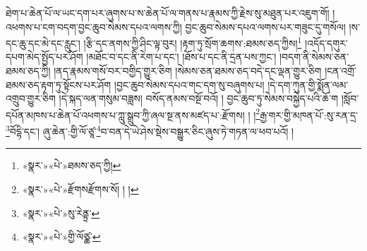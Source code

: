 ཐེག་པ་ཆེན་པོ་ལ་ཡང་དག་པར་ཞུགས་པ་ས་ཆེན་པོ་ལ་གནས་པ་རྣམས་ཀྱི་རྗེས་སུ་མཐུན་པར་འཇུག་གོ། །འཕགས་པ་ངག་བདག་བྱང་ཆུབ་སེམས་དཔའ་ལགས་ཀྱི། བྱང་ཆུབ་སེམས་དཔའ་ལགས་པར་གཟུང་དུ་གསོལ། །ས་དང་ཆུ་དང་མེ་དང་རླུང་། །རྩི་དང་ནགས་ཀྱི་ཤིང་ལྟ་བུར། །རྟག་ཏུ་སྲོག་ཆགས་:ཐམས་ཅད་ཀྱིས།\footnote{«སྣར་»«པེ་»ཐམས་ཅད་ཀྱི།} །འདོད་དགུར་དཔག་མེད་སྤྱོད་པར་ཤོག །མཐོང་བ་དང་ནི་རེག་པ་དང་། །ཐོས་པ་དང་ནི་དྲན་པས་ཀྱང་། །བདག་ནི་སེམས་ཅན་ཐམས་ཅད་ཀྱི། །ནད་རྣམས་གསོ་བར་བགྱིད་གྱུར་ཅིག །སེམས་ཅན་ཐམས་ཅད་བདེ་དང་ལྡན་གྱུར་ཅིག །ངན་འགྲོ་ཐམས་ཅད་རྟག་ཏུ་སྟོངས་པར་ཤོག །བྱང་ཆུབ་སེམས་དཔའ་གང་དག་སུ་བཞུགས་པ། །དེ་དག་ཀུན་གྱི་སྨོན་ལམ་འགྲུབ་གྱུར་ཅིག །དེ་སྐད་ལན་གསུམ་བཟླས། བསོད་ནམས་བསྔོ་བའོ། །
བྱང་ཆུབ་ཏུ་སེམས་བསྐྱེད་པའི་ཆོ་ག །སློབ་དཔོན་མཁས་པ་ཆེན་པོ་འཕགས་པ་ཀླུ་སྒྲུབ་ཀྱི་ཞལ་སྔ་ནས་མཛད་པ་:རྫོགས། ། །\footnote{«སྣར་»«པེ་»རྫོགསརྫོགས་སོ། ། །}རྒྱ་གར་གྱི་མཁན་པོ་:སུ་རན་དྲ་\footnote{«སྣར་»«པེ་»སུ་རེནྟྲ་}བོདྷི་དང་། ཞུ་ཆེན་:གྱི་ལོ་ཙཱ་\footnote{«སྣར་»«པེ་»གྱི་ལོཙྪ་}བ་བན་དེ་ཡེ་ཤེས་སྡེས་བསྒྱུར་ཅིང་ཞུས་ཏེ་གཏན་ལ་ཕབ་པའོ། ། 